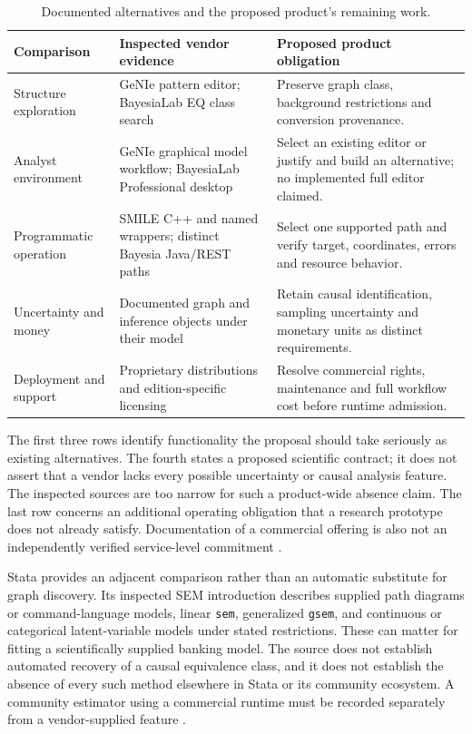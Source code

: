 \begin{table}[htbp]
\centering\small
\caption{Documented alternatives and the proposed product's remaining work.}
\label{exec13:commercial-comparison}
\begin{tabularx}{\linewidth}{@{}P{.23\linewidth}XX@{}}
\toprule
Comparison & Inspected vendor evidence & Proposed product obligation \\
\midrule
Structure exploration & GeNIe pattern editor; BayesiaLab EQ class search &
Preserve graph class, background restrictions and conversion provenance. \\
Analyst environment & GeNIe graphical model workflow; BayesiaLab Professional desktop &
Select an existing editor or justify and build an alternative; no implemented full editor claimed. \\
Programmatic operation & SMILE C++ and named wrappers; distinct Bayesia Java/REST paths &
Select one supported path and verify target, coordinates, errors and resource behavior. \\
Uncertainty and money & Documented graph and inference objects under their model &
Retain causal identification, sampling uncertainty and monetary units as distinct requirements. \\
Deployment and support & Proprietary distributions and edition-specific licensing &
Resolve commercial rights, maintenance and full workflow cost before runtime admission. \\
\bottomrule
\end{tabularx}
\end{table}

The first three rows identify functionality the proposal should take seriously
as existing alternatives. The fourth states a proposed scientific contract;
it does not assert that a vendor lacks every possible uncertainty or causal
analysis feature. The inspected sources are too narrow for such a product-wide
absence claim. The last row concerns an additional operating obligation that
a research prototype does not already satisfy. Documentation of a commercial
offering is also not an independently verified service-level commitment
\citep{exec13_genie_pattern,exec13_smile_intro,exec13_bayesia_eq,
exec13_bayesia_professional}.

Stata provides an adjacent comparison rather than an automatic substitute for
graph discovery. Its inspected SEM introduction describes supplied path
diagrams or command-language models, linear \texttt{sem}, generalized
\texttt{gsem}, and continuous or categorical latent-variable models under
stated restrictions. These can matter for fitting a scientifically supplied
banking model. The source does not establish automated recovery of a causal
equivalence class, and it does not establish the absence of every such method
elsewhere in Stata or its community ecosystem. A community estimator using a
commercial runtime must be recorded separately from a vendor-supplied feature
\citep{exec13_stata_sem}.

